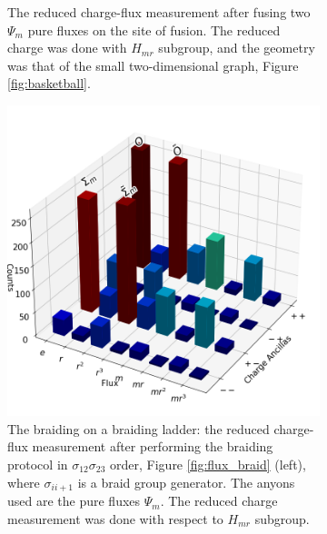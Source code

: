 \documentclass[two column]{article}
\begin{document}
\begin{figure}
\begin{subfigure}{0.47\textwidth}
    \caption{The reduced charge-flux measurement after fusing two $\Psi_m$ pure fluxes on the site of fusion. The reduced charge was done with $H_{mr}$ subgroup, and the geometry was that of the small two-dimensional graph, Figure \ref{fig:basketball}.}
    \label{fig:fusion_basketball}
\end{subfigure}
\vspace{15pt}

\begin{subfigure}{0.47\textwidth}
    \includegraphics[width=\linewidth]{Figures/braid_fusion.png}
    \caption{The braiding on a braiding ladder: the reduced charge-flux measurement after performing the braiding protocol in $\sigma_{12}\sigma_{23}$ order, Figure \ref{fig:flux_braid} (left), where $\sigma_{ii+1}$ is a braid group generator. The anyons used are the pure fluxes $\Psi_m$. The reduced charge measurement was done with respect to $H_{mr}$ subgroup.} 
    \label{fig:braid_fuse}
\end{subfigure}\hfill
\begin{subfigure}{0.47\textwidth}

\end{subfigure}
\end{figure}
\end{document}
